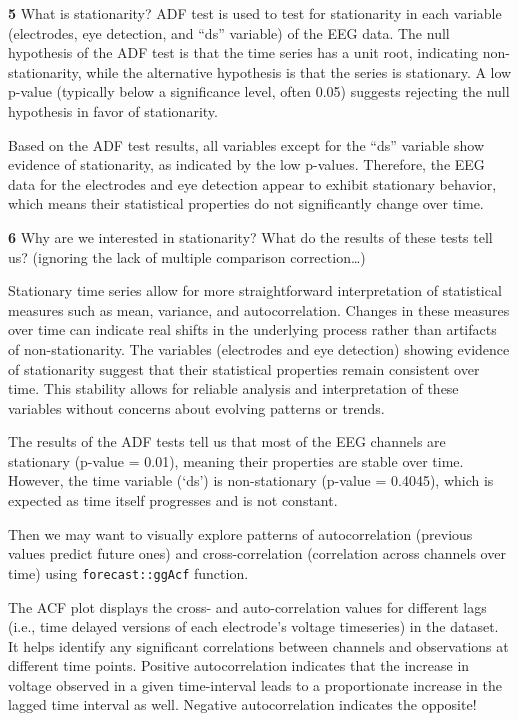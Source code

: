 \documentclass[
]{article}
\begin{document}
\textbf{5} What is stationarity? ADF test is used to test for
stationarity in each variable (electrodes, eye detection, and ``ds''
variable) of the EEG data. The null hypothesis of the ADF test is that
the time series has a unit root, indicating non-stationarity, while the
alternative hypothesis is that the series is stationary. A low p-value
(typically below a significance level, often 0.05) suggests rejecting
the null hypothesis in favor of stationarity.

Based on the ADF test results, all variables except for the ``ds''
variable show evidence of stationarity, as indicated by the low
p-values. Therefore, the EEG data for the electrodes and eye detection
appear to exhibit stationary behavior, which means their statistical
properties do not significantly change over time.

\textbf{6} Why are we interested in stationarity? What do the results of
these tests tell us? (ignoring the lack of multiple comparison
correction\ldots)

Stationary time series allow for more straightforward interpretation of
statistical measures such as mean, variance, and autocorrelation.
Changes in these measures over time can indicate real shifts in the
underlying process rather than artifacts of non-stationarity. The
variables (electrodes and eye detection) showing evidence of
stationarity suggest that their statistical properties remain consistent
over time. This stability allows for reliable analysis and
interpretation of these variables without concerns about evolving
patterns or trends.

The results of the ADF tests tell us that most of the EEG channels are
stationary (p-value = 0.01), meaning their properties are stable over
time. However, the time variable (`ds') is non-stationary (p-value =
0.4045), which is expected as time itself progresses and is not
constant.

Then we may want to visually explore patterns of autocorrelation
(previous values predict future ones) and cross-correlation (correlation
across channels over time) using \texttt{forecast::ggAcf} function.

The ACF plot displays the cross- and auto-correlation values for
different lags (i.e., time delayed versions of each electrode's voltage
timeseries) in the dataset. It helps identify any significant
correlations between channels and observations at different time points.
Positive autocorrelation indicates that the increase in voltage observed
in a given time-interval leads to a proportionate increase in the lagged
time interval as well. Negative autocorrelation indicates the opposite!
\end{document}

